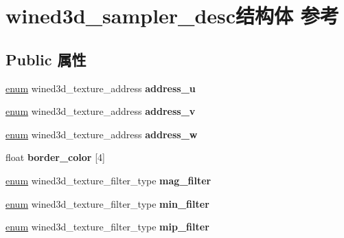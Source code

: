 \hypertarget{structwined3d__sampler__desc}{}\section{wined3d\+\_\+sampler\+\_\+desc结构体 参考}
\label{structwined3d__sampler__desc}
\subsection*{Public 属性}
\begin{DoxyCompactItemize}
\item 
\mbox{\label{structwined3d__sampler__desc_aaf6a22c97199034104a552e9e49ac647}} 
\hyperlink{interfaceenum}{enum} wined3d\+\_\+texture\+\_\+address {\bfseries address\+\_\+u}
\item 
\mbox{\label{structwined3d__sampler__desc_a0235f110047a3a4b46c9df70d8617dcd}} 
\hyperlink{interfaceenum}{enum} wined3d\+\_\+texture\+\_\+address {\bfseries address\+\_\+v}
\item 
\mbox{\label{structwined3d__sampler__desc_afbfeed7035659913f33f5f311af0fee6}} 
\hyperlink{interfaceenum}{enum} wined3d\+\_\+texture\+\_\+address {\bfseries address\+\_\+w}
\item 
\mbox{\label{structwined3d__sampler__desc_abaa0bd89b1dafccdb259cd5f50f7d48b}} 
float {\bfseries border\+\_\+color} \mbox{[}4\mbox{]}
\item 
\mbox{\label{structwined3d__sampler__desc_a46a5481040cc7f327d68d4e4d4c66660}} 
\hyperlink{interfaceenum}{enum} wined3d\+\_\+texture\+\_\+filter\+\_\+type {\bfseries mag\+\_\+filter}
\item 
\mbox{\label{structwined3d__sampler__desc_aa4a55b2e0f40207c8a76b4d9d0e1f2ef}} 
\hyperlink{interfaceenum}{enum} wined3d\+\_\+texture\+\_\+filter\+\_\+type {\bfseries min\+\_\+filter}
\item 
\mbox{\label{structwined3d__sampler__desc_ad55836962c42dd48f9df3416d317b5e4}} 
\hyperlink{interfaceenum}{enum} wined3d\+\_\+texture\+\_\+filter\+\_\+type {\bfseries mip\+\_\+filter}

\end{DoxyCompactItemize}

